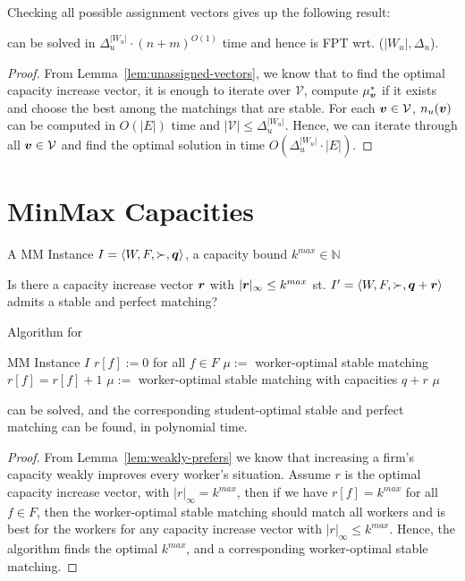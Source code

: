 Checking all possible assignment vectors gives up the following result:

\begin{theorem}
  \MinSumSP can be solved in $\Delta_u^{|W_u|} \cdot (n + m)^{O(1)}$ time and hence is FPT wrt. ($|W_u|, \Delta_u$).
\end{theorem}

\begin{proof}
  From Lemma~\ref{lem:unassigned-vectors}, we know that to find the optimal capacity increase vector, it is enough to iterate over $\mathcal{V}$, compute $\mu^*_{\boldsymbol{v}}$ if it exists and choose the best among the matchings that are stable. For each ${\boldsymbol{v}} \in \mathcal{V}$, $n_u({\boldsymbol{v}})$ can be computed in $O(|E|)$ time and $|\mathcal{V}| \leq \Delta_u^{|W_u|}$. Hence, we can iterate through all ${\boldsymbol{v}} \in \mathcal{V}$ and find the optimal solution in time $O(\Delta_u^{|W_u|} \cdot |E|)$.
\end{proof}

\section{MinMax Capacities}

\begin{pinput}
  A MM Instance $I = \left< W, F, \succ, \boldsymbol{q} \right>$, a capacity bound $ k^{max} \in \mathbb{N}$
\end{pinput}
\begin{question}[\MinMaxSP]
  Is there a capacity increase vector $\boldsymbol{r}$ with $|\boldsymbol{r}|_\infty \leq k^{max}$ st. $I' = \left< W, F, \succ, \boldsymbol{q} + \boldsymbol{r} \right>$ admits a stable and perfect matching?
\end{question}

\begin{algorithm}
  \caption{Algorithm for \MinMaxSP}
  \label{algo:MinMaxSP-Algorithm}
  \begin{algorithmic}
    \REQUIRE MM Instance $I$
    \STATE $r[f] := 0$ for all $f \in F$
    \STATE $\mu :=$ worker-optimal stable matching
    \STATE $r[f] = r[f] + 1$
    \STATE $\mu :=$ worker-optimal stable matching with capacities $q + r$
    \ENDWHILE
    \RETURN $\mu$
  \end{algorithmic}
\end{algorithm}

\begin{theorem}
  \MinMaxSP can be solved, and the corresponding student-optimal stable and perfect matching can be found, in polynomial time.
\end{theorem}

\begin{proof}
  From Lemma~\ref{lem:weakly-prefers} we know that increasing a firm's capacity weakly improves every worker's situation. Assume $r$ is the optimal capacity increase vector, with $|r|_\infty = k^{max}$, then if we have $r[f] = k^{max}$ for all $f \in F$, then the worker-optimal stable matching should match all workers and is best for the workers for any capacity increase vector with $|r|_\infty \leq k^{max}$. Hence, the algorithm finds the optimal $k^{max}$, and a corresponding worker-optimal stable matching.
\end{proof}